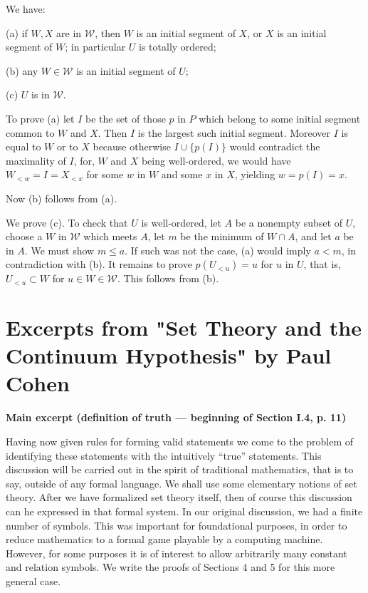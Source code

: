 \documentclass[12pt]{article}
\begin{document}
We have: 

(a) if $W,X$ are in $\mathcal W$, then $W$ is an initial segment of $X$, or $X$ is an initial segment of $W$; in particular $U$ is totally ordered;

(b) any $W\in\mathcal W$ is an initial segment of $U$; 

(c) $U$ is in $\mathcal W$.

To prove (a) let $I$ be the set of those $p$ in $P$ which belong to some initial segment common to $W$ and $X$. Then $I$ is the largest such initial segment. Moreover $I$ is equal to $W$ or to $X$ because otherwise $I\cup\{p(I)\}$ would contradict the maximality of $I$, for, $W$ and $X$ being well-ordered, we would have $W_{<w}=I=X_{<x}$ for some $w$ in $W$ and some $x$ in $X$, yielding $w=p(I)=x$. 

Now (b) follows from (a). 

We prove (c). To check that $U$ is well-ordered, let $A$ be a nonempty subset of $U$, choose a $W$ in $\mathcal W$ which meets $A$, let $m$ be the minimum of $W\cap A$, and let $a$ be in $A$. We must show $m\le a$. If such was not the case, (a) would imply $a<m$, in contradiction with (b). It remains to prove $p(U_{<u})=u$ for $u$ in $U$, that is, $U_{<u}\subset W$ for $u\in W\in\mathcal W$. This follows from (b). 
% 
\newpage 
%
\section{Excerpts from "Set Theory and the Continuum Hypothesis" by Paul Cohen} 
%
\centerline{\textbf{Main excerpt (definition of truth --- beginning of Section I.4, p. 11)}}

Having now given rules for forming valid statements we come to the problem of identifying these statements with the intuitively ``true'' statements. This discussion will be carried out in the spirit of traditional mathematics, that is to say, outside of any formal language. We shall use some elementary notions of set theory. After we have formalized set theory itself, then of course this discussion can he expressed in that formal system. In our original discussion, we had a finite number of symbols. This was important for foundational purposes, in order to reduce mathematics to a formal game playable by a computing machine. However, for some purposes it is of interest to allow arbitrarily many constant and relation symbols. We write the proofs of Sections 4 and 5 for this more general case.
\end{document}
